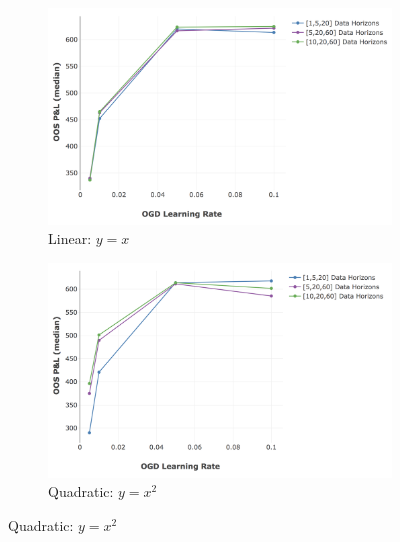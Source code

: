 \documentclass[a4paper,11pt,oneside]{article}
\theoremstyle{plain}
\theoremstyle{definition}
\begin{document}
		\newpage
		\begin{figure}
			\centering
			\begin{subfigure}{0.45\linewidth}
				\centering\includegraphics[scale=0.3]{images/results/primary/OOS_OGDLR_Delta_Encoding_25_median.png}
				\caption{Linear: $y=x$}
			\end{subfigure}
			\begin{subfigure}{0.49\linewidth}
				\centering\includegraphics[scale=0.3]{images/results/primary/OOS_OGDLR_Delta_Encoding_20_median.png}
				\caption{Quadratic: $y=x^2$}
			\end{subfigure}%
			

\end{figure}
\end{document}
